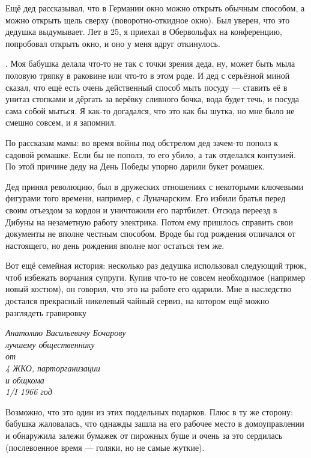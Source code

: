 \documentclass{book}
\begin{document}
Ещё дед рассказывал, что в Германии окно можно открыть обычным способом, а можно открыть щель сверху
(поворотно-откидное окно).
Был уверен, что это дедушка выдумывает.
Лет в 25, я приехал в Обервольфах на конференцию, попробовал открыть окно, и оно у меня вдруг откинулось.

.
Моя бабушка делала что-то не так с точки зрения деда, ну, может быть мыла половую тряпку в раковине или что-то в этом роде.
И дед с серьёзной миной сказал, что ещё есть очень действенный способ мыть посуду --- ставить её в унитаз стопками и дёргать за верёвку сливного бочка, вода будет течь, и посуда сама собой мыться.
Я как-то догадался, что это как бы шутка, но мне было не смешно совсем, и я запомнил.

\medskip

По рассказам мамы: во время войны под обстрелом дед зачем-то пополз к садовой ромашке.
Если бы не пополз, то его убило, а так отделался контузией.
По этой причине деду на День Победы упорно дарили букет ромашек.

Дед принял революцию, был в дружеских отношениях с некоторыми ключевыми фигурами того времени, например, с Луначарским.
Его избили братья перед своим отъездом за кордон и уничтожили его партбилет.
Отсюда переезд в Дибуны на незаметную работу электрика.
Потом ему пришлось справить свои документы не вполне честным способом.
Вроде бы год рождения отличался от настоящего, но день рождения вполне мог остаться тем же.

Вот ещё семейная история:
несколько раз дедушка использовал следующий трюк, чтоб избежать ворчания супруги.
Купив что-то не совсем необходимое (например новый костюм), он говорил, что это на работе его одарили.
Мне в наследство достался прекрасный никелевый чайный сервиз, на котором ещё можно разглядеть гравировку
\begin{center}
\textit{
Анатолию Васильевичу Бочарову\\
лучшему общественнику\\
от\\
4 ЖКО, парторганизации\\
и общкома\\
1/I 1966 год}
\end{center}
Возможно, что это один из этих поддельных подарков.
Плюс в ту же сторону: бабушка жаловалась, что однажды зашла на его рабочее место в домоуправлении и обнаружила залежи бумажек от пирожных буше и очень за это сердилась (послевоенное время --- голяки, но не самые жуткие).
\end{document}
